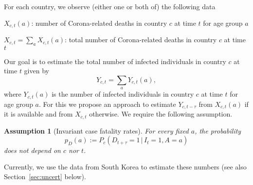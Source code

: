 \documentclass[a4paper]{article}
\newtheorem{ass}{Assumption}
\renewcommand\P{\mathbb{P}}
\newcommand{\given}{\, \vert \,}
\begin{document}


For each country, we observe (either one or both of) the following data
\begin{compactitem}
\item $X_{c,t}(a)$: number of Corona-related deaths in country $c$ at
  time $t$ for age group $a$
\item $X_{c,t} = \sum_a X_{c,t}(a)$: total number of Corona-related
  deaths in country $c$ at time $t$
\end{compactitem}
Our goal is to estimate the total number of infected
individuals in country $c$ at time $t$ given by
$$Y_{c,t} = \sum_a Y_{c,t}(a),$$ where $Y_{c,t}(a)$ is the number of
infected individuals in country $c$ at time $t$ for age group $a$.
For this we propose an approach to estimate $Y_{c,t-\tau}$ from
$X_{c,t}(a)$ if it is available and from $X_{c,t}$ otherwise. We require the following assumption.


\begin{ass}[Invariant case fatality rates] \label{ass:1}
For every fixed $a$, the probability 
\begin{equation*}
p_D(a) := P_c(D_{t+\tau} = 1\,|\,I_t = 1, A = a)
\end{equation*}
does not depend on $c$ nor $t$.
\end{ass}
%
Currently, we use the data from South Korea to 
estimate these numbers (see also Section~\ref{sec:uncert} below). 
\end{document}
